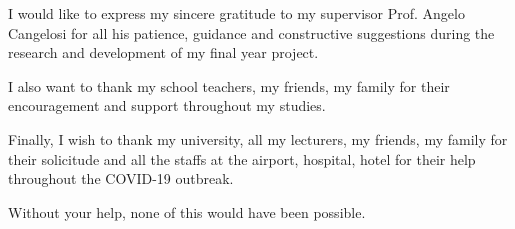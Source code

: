 I would like to express my sincere gratitude to my supervisor Prof. Angelo Cangelosi 
for all his patience, guidance and constructive suggestions during the research and 
development of my final year project. 

I also want to thank my school teachers, my friends, my family for their encouragement 
and support throughout my studies. 

Finally, I wish to thank my university, all my lecturers, my friends, 
my family for their solicitude and all the staffs at the airport, hospital, hotel 
for their help throughout the COVID-19 outbreak.

Without your help, none of this would have been possible.


